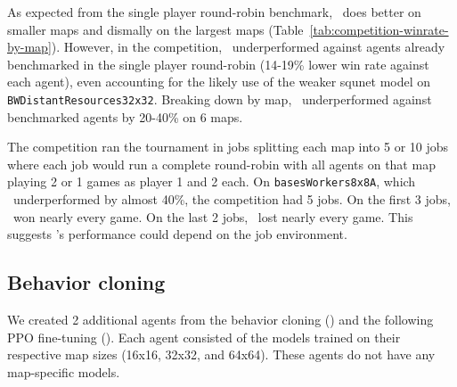 \documentclass{article}
\begin{document}
As expected from the single player round-robin benchmark, \agentName\ does better on
smaller maps and dismally on the largest maps
(Table~\ref{tab:competition-winrate-by-map}). However, in the competition, \agentName\
underperformed against agents already benchmarked in the single player round-robin
(14-19\% lower win rate against each agent), even accounting for the likely use of
the weaker squnet model on \texttt{BWDistantResources32x32}.  Breaking down by map, 
\agentName\ underperformed against benchmarked agents by 20-40\% on 6 maps.

The competition ran the tournament in jobs splitting each map into 5 or 10 jobs where
each job would run a complete round-robin with all agents on that map playing 2 or 1
games as player 1 and 2 each. On \texttt{basesWorkers8x8A}, which \agentName\
underperformed by almost 40\%, the competition had 5 jobs. On the first 3 jobs,
\agentName\ won nearly every game. On the last 2 jobs, \agentName\ lost nearly every
game. This suggests \agentName's performance could depend on the job environment.

\subsection{Behavior cloning}
\label{sec:behavior-cloning-results}
We created 2 additional agents from the behavior cloning (\bcAgent) and the following
PPO fine-tuning (\bcPPOAgent). Each agent consisted of the models trained on their
respective map sizes (16x16, 32x32, and 64x64). These agents do not have any
map-specific models.
\end{document}
